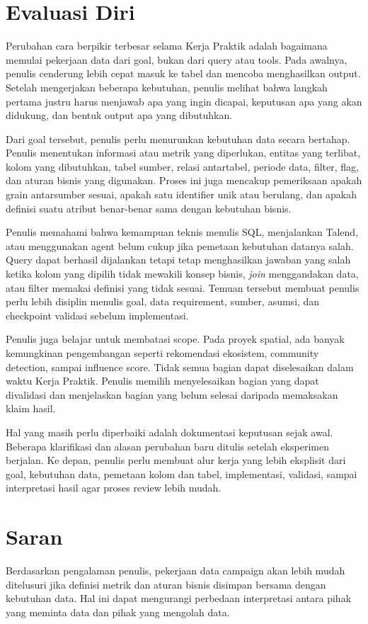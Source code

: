 \section{Evaluasi Diri}
Perubahan cara berpikir terbesar selama Kerja Praktik adalah bagaimana memulai pekerjaan data dari goal, bukan dari query atau tools. Pada awalnya, penulis cenderung lebih cepat masuk ke tabel dan mencoba menghasilkan output. Setelah mengerjakan beberapa kebutuhan, penulis melihat bahwa langkah pertama justru harus menjawab apa yang ingin dicapai, keputusan apa yang akan didukung, dan bentuk output apa yang dibutuhkan.

Dari goal tersebut, penulis perlu menurunkan kebutuhan data secara bertahap. Penulis menentukan informasi atau metrik yang diperlukan, entitas yang terlibat, kolom yang dibutuhkan, tabel sumber, relasi antartabel, periode data, filter, flag, dan aturan bisnis yang digunakan. Proses ini juga mencakup pemeriksaan apakah grain antarsumber sesuai, apakah satu identifier unik atau berulang, dan apakah definisi suatu atribut benar-benar sama dengan kebutuhan bisnis.

Penulis memahami bahwa kemampuan teknis menulis SQL, menjalankan Talend, atau menggunakan agent belum cukup jika pemetaan kebutuhan datanya salah. Query dapat berhasil dijalankan tetapi tetap menghasilkan jawaban yang salah ketika kolom yang dipilih tidak mewakili konsep bisnis, \textit{join} menggandakan data, atau filter memakai definisi yang tidak sesuai. Temuan tersebut membuat penulis perlu lebih disiplin menulis goal, data requirement, sumber, asumsi, dan checkpoint validasi sebelum implementasi.

Penulis juga belajar untuk membatasi scope. Pada proyek spatial, ada banyak kemungkinan pengembangan seperti rekomendasi ekosistem, community detection, sampai influence score. Tidak semua bagian dapat diselesaikan dalam waktu Kerja Praktik. Penulis memilih menyelesaikan bagian yang dapat divalidasi dan menjelaskan bagian yang belum selesai daripada memaksakan klaim hasil.

Hal yang masih perlu diperbaiki adalah dokumentasi keputusan sejak awal. Beberapa klarifikasi dan alasan perubahan baru ditulis setelah eksperimen berjalan. Ke depan, penulis perlu membuat alur kerja yang lebih eksplisit dari goal, kebutuhan data, pemetaan kolom dan tabel, implementasi, validasi, sampai interpretasi hasil agar proses review lebih mudah.

\section{Saran}
Berdasarkan pengalaman penulis, pekerjaan data campaign akan lebih mudah ditelusuri jika definisi metrik dan aturan bisnis disimpan bersama dengan kebutuhan data. Hal ini dapat mengurangi perbedaan interpretasi antara pihak yang meminta data dan pihak yang mengolah data.

